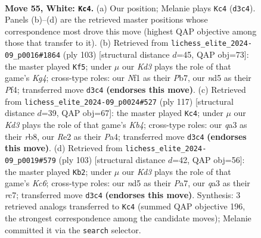\documentclass[11pt]{article}
\begin{document}
\clearpage

\begin{figure}[p]\centering
\begin{subfigure}{0.46\textwidth}\centering
\resizebox{\linewidth}{!}{%
\newchessgame
\chessboard[
  setfen={8/1b3pk1/6p1/3n4/3R3P/q2K4/4R2P/5N2 w - - 17 55},
  showmover=false,
  pgfstyle=straightmove, color=movearrow, markmove={d3-c4}
]}
\caption{}
\end{subfigure}\hfill
\begin{subfigure}{0.46\textwidth}\centering
\resizebox{\linewidth}{!}{%
\newchessgame
\chessboard[
  setfen={3Q4/1p6/p7/6kr/P4p2/1P4r1/1KP5/8 b - - 8 52},
  showmover=false,
  pgfstyle=straightmove, color=movearrow, markmove={g5-f5}
]}
\caption{}
\end{subfigure}
\\[4pt]
\begin{subfigure}{0.46\textwidth}\centering
\resizebox{\linewidth}{!}{%
\newchessgame
\chessboard[
  setfen={1R6/4PK2/5B2/1k6/pp2r3/8/4r3/8 b - - 3 59},
  showmover=false,
  pgfstyle=straightmove, color=movearrow, markmove={b5-c4}
]}
\caption{}
\end{subfigure}\hfill
\begin{subfigure}{0.46\textwidth}\centering
\resizebox{\linewidth}{!}{%
\newchessgame
\chessboard[
  setfen={8/p1R5/r5p1/P6p/8/1rk4P/5PK1/8 b - - 15 52},
  showmover=false,
  pgfstyle=straightmove, color=movearrow, markmove={c3-b2}
]}
\caption{}
\end{subfigure}
\caption{\textbf{Move 55, White: \texttt{Kc4}.} (a) Our position; Melanie plays \texttt{Kc4} (\texttt{d3c4}). Panels (b)--(d) are the retrieved master positions whose correspondence most drove this move (highest QAP objective among those that transfer to it). (b) Retrieved from \texttt{lichess\_elite\_2024-09\_p0016\#1864} (ply 103) [structural distance $d$=45, QAP obj=73]: the master played \texttt{Kf5}; under $\mu$ our \emph{Kd3} plays the role of that game's \emph{Kg4}; cross-type roles: our \emph{N}f1 as their \emph{P}b7, our \emph{n}d5 as their \emph{P}f4; transferred move \texttt{d3c4} \textbf{(endorses this move)}. (c) Retrieved from \texttt{lichess\_elite\_2024-09\_p0024\#527} (ply 117) [structural distance $d$=39, QAP obj=67]: the master played \texttt{Kc4}; under $\mu$ our \emph{Kd3} plays the role of that game's \emph{Kb4}; cross-type roles: our \emph{q}a3 as their \emph{r}b8, our \emph{R}e2 as their \emph{P}a4; transferred move \texttt{d3c4} \textbf{(endorses this move)}. (d) Retrieved from \texttt{lichess\_elite\_2024-09\_p0019\#579} (ply 103) [structural distance $d$=42, QAP obj=56]: the master played \texttt{Kb2}; under $\mu$ our \emph{Kd3} plays the role of that game's \emph{Kc6}; cross-type roles: our \emph{n}d5 as their \emph{P}a7, our \emph{q}a3 as their \emph{r}c7; transferred move \texttt{d3c4} \textbf{(endorses this move)}. Synthesis: 3 retrieved analogs transferred to \texttt{Kc4} (summed QAP objective 196, the strongest correspondence among the candidate moves); Melanie committed it via the \texttt{search} selector.}
\label{fig:thought-m108}
\end{figure}
\end{document}
